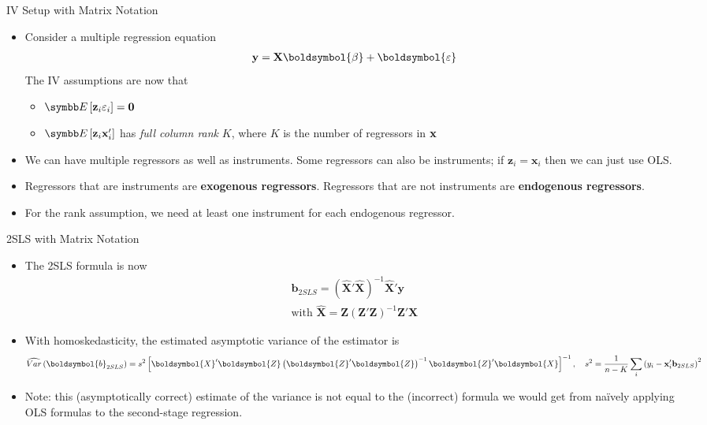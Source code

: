 \documentclass[aspectratio=169,11pt]{beamer}
\begin{document}
\begin{frame}{IV Setup with Matrix Notation}
\begin{itemize}
\item Consider a multiple regression equation
\begin{align*}
{\bf y}={\bf X}\boldsymbol{\beta}+\boldsymbol{\varepsilon}
\end{align*}
The IV assumptions are now that
\begin{itemize}
\item $\E\left[{\bf z}_{i}\varepsilon_{i}\right]={\bf 0}$
\item $\E\left[{\bf z}_{i}{\bf x}_{i}'\right]$ has \emph{full column rank} $K$, where $K$ is
	the number of regressors in ${\bf x}$
\end{itemize}
\item We can have multiple regressors as well as instruments. Some regressors can also be instruments; if $\boldsymbol{z}_{i}=\boldsymbol{x}_{i}$
then we can just use OLS.
\item Regressors that are instruments are \textbf{exogenous regressors}.
Regressors that are not instruments are \textbf{endogenous regressors}.
\item For the rank assumption, we need at least one instrument for each
endogenous regressor.
\end{itemize}
\end{frame}


\begin{frame}{2SLS with Matrix Notation}
\begin{itemize}
\item The 2SLS formula is now
\begin{align*}
\boldsymbol{b}_{2SLS}=\left(\hat{\boldsymbol{X}}'\hat{\boldsymbol{X}}\right)^{-1}\hat{\boldsymbol{X}}'\boldsymbol{y}\\
	\text{with }\hat{\boldsymbol{X}}=\boldsymbol{Z}\left(\boldsymbol{Z}'\boldsymbol{Z}\right)^{-1}\boldsymbol{Z}'\boldsymbol{X}
\end{align*}
\smallskip
\item With homoskedasticity, the estimated asymptotic variance of the estimator is
\begin{align*}
\widehat{Var}\left(\boldsymbol{b}_{2SLS}\right)=s^{2}\left[\boldsymbol{X}'\boldsymbol{Z}\left(\boldsymbol{Z}'\boldsymbol{Z}\right)^{-1}\boldsymbol{Z}'\boldsymbol{X}\right]^{-1}, \quad s^2 = \frac{1}{n-K}\sum_i \left(y_i - {\bf x}_i'{\bf b}_{2SLS}\right)^2
\end{align*}
\smallskip
	\item Note: this  (asymptotically correct) estimate of the variance is not equal to the (incorrect) formula we would get
	from na{\"i}vely applying OLS formulas to the second-stage regression.

\end{itemize}
\end{frame}
\end{document}
